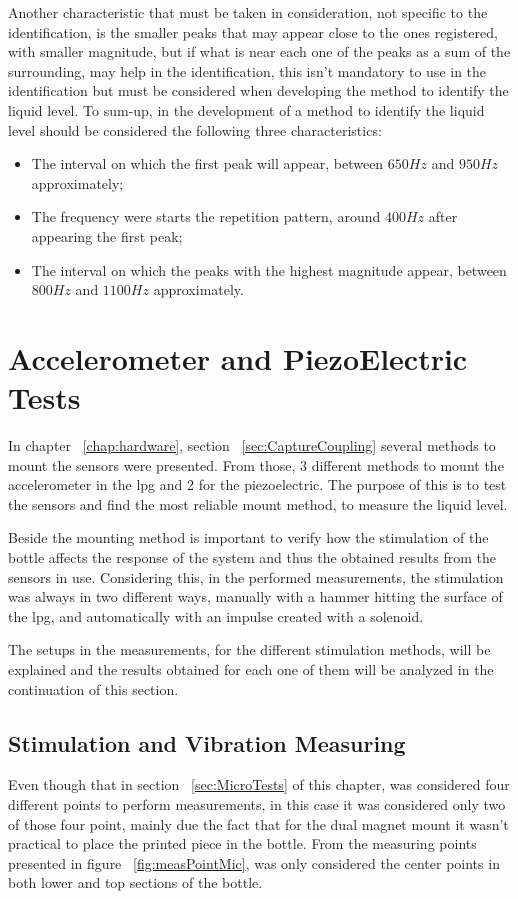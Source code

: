 Another characteristic that must be taken in consideration, not specific to the identification, is the smaller peaks that may appear close to the ones registered, with smaller magnitude, but if what is near each one of the peaks as a sum of the surrounding, may help in the identification, this isn't mandatory to use in the identification but must be considered when developing the method to identify the liquid level.
To sum-up, in the development of a method to identify the liquid level should be considered the following three characteristics:
\begin{itemize}
    \item The interval on which the first peak will appear, between $650Hz$ and $950Hz$ approximately;
    \item The frequency were starts the repetition pattern, around $400Hz$ after appearing the first peak;
    \item The interval on which the peaks with the highest magnitude appear, between $800Hz$ and $1100Hz$ approximately. 
\end{itemize}

\section{Accelerometer and PiezoElectric Tests}

In chapter ~\ref{chap:hardware}, section ~\ref{sec:CaptureCoupling} several methods to mount the sensors were presented. From those, 3 different methods to mount the accelerometer in the \acrshort{lpg} and 2 for the piezoelectric. The purpose of this is to test the sensors and find the most reliable mount method, to measure the liquid level.

Beside the mounting method is important to verify how the stimulation of the bottle affects the response of the system and thus the obtained results from the sensors in use. Considering this, in the performed measurements, the stimulation was always in two different ways, manually with a hammer hitting the surface of the \acrshort{lpg}, and automatically with an impulse created with a solenoid.

The setups in the measurements, for the different stimulation methods, will be explained and the results obtained for each one of them will be analyzed in the continuation of this section.
\subsection{Stimulation and Vibration Measuring}
Even though that in section ~\ref{sec:MicroTests} of this chapter, was considered four different points to perform measurements, in this case it was considered only two of those four point, mainly due the fact that for the dual magnet mount it wasn't practical to place the printed piece in the bottle. From the measuring points presented in figure ~\ref{fig:measPointMic}, was only considered the center points in both lower and top sections of the bottle.

